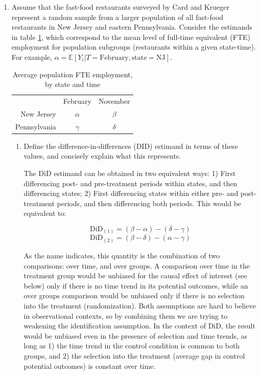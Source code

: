 \documentclass[
  12pt,
  letterpaper,
  DIV=11,
  numbers=noendperiod]{scrartcl}
\newcommand{\1}[1]{\mathds{1}\left[#1\right]}
\begin{document}
\begin{enumerate}
\item

Assume that the fast-food restaurants surveyed by Card and Krueger
represent a random sample from a larger population of all fast-food
restaurants in New Jersey and eastern Pennsylvania. Consider the
estimands in table \ref{tab:estimands}, which correspond to the mean
level of full-time equivalent (FTE) employment for population subgroups
(restaurants within a given state-time). For example,
\(\alpha = \mathbb{E}[Y_i|T=\text{February},\text{state}=\text{NJ}]\).

\begin{table}[!ht]
\begin{center}
\begin{tabular}{rcc}
               &   February    &   November    \\
New Jersey      &   $\alpha$      &   $\beta$       \\
Pennsylvania    &   $\gamma$      &   $\delta$      \\
\end{tabular}
\caption{Average population FTE employment, by state and time}
\label{tab:estimands}
\end{center}
\end{table}

\begin{enumerate}
\item[(i)]

Define the difference-in-differences (DID) estimand in terms of these
values, and concisely explain what this represents.

The DiD estimand can be obtained in two equivalent ways: 1) First
differencing post- and pre-treatment periods within states, and then
differencing states; 2) First differencing states within either pre- and
post-treatment periods, and then differencing both periods. This would
be equivalent to:

\[\text{DiD}_{(1)} = (\beta - \alpha) - (\delta - \gamma)\]
\[\text{DiD}_{(2)} = (\beta - \delta) - (\alpha - \gamma)\]

As the name indicates, this quantity is the combination of two
comparisons: over time, and over groups. A comparison over time in the
treatment group would be unbiased for the causal effect of interest (see
below) only if there is no time trend in its potential outcomes, while
an over groups comparison would be unbiased only if there is no
selection into the treatment (randomization). Both assumptions are hard
to believe in observational contexts, so by combining them we are trying
to weakening the identification assumption. In the context of DiD, the
result would be unbiased even in the presence of selection and time
trends, as long as 1) the time trend in the control condition is common
to both groups, and 2) the selection into the treatment (average gap in
control potential outcomes) is constant over time.


\end{enumerate}
\end{enumerate}
\end{document}
